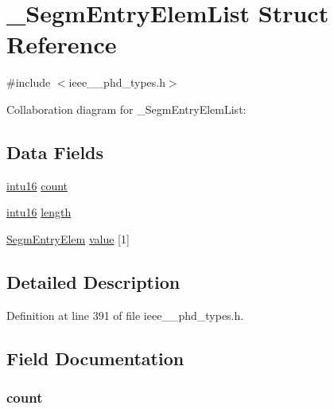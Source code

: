\hypertarget{struct___segm_entry_elem_list}{}\section{\+\_\+\+Segm\+Entry\+Elem\+List Struct Reference}
\label{struct___segm_entry_elem_list}


{\ttfamily \#include $<$ieee\+\_\+\_\+phd\+\_\+types.\+h$>$}



Collaboration diagram for \+\_\+\+Segm\+Entry\+Elem\+List\+:
\subsection*{Data Fields}
\begin{DoxyCompactItemize}
\item 
\hyperlink{ieee__11073__phd__types_8h_a3561595d2aa7416532e1c9910abd076d}{intu16} \hyperlink{struct___segm_entry_elem_list_abf6db060ae8e224764b0f867fb135ecd}{count}
\item 
\hyperlink{ieee__11073__phd__types_8h_a3561595d2aa7416532e1c9910abd076d}{intu16} \hyperlink{struct___segm_entry_elem_list_a3743679e4ff85e3e1b3fc2e59973fbb3}{length}
\item 
\hyperlink{ieee__11073__phd__types_8h_a038faadfbb7a47075cd8d815fafa8c3c}{Segm\+Entry\+Elem} \hyperlink{struct___segm_entry_elem_list_a345d78086f1ff5d9773550cb1f4de9f1}{value} \mbox{[}1\mbox{]}
\end{DoxyCompactItemize}


\subsection{Detailed Description}


Definition at line 391 of file ieee\+\_\+\_\+phd\+\_\+types.\+h.



\subsection{Field Documentation}
\hypertarget{struct___segm_entry_elem_list_abf6db060ae8e224764b0f867fb135ecd}{}
\subsubsection[{count}]{ count}\label{struct___segm_entry_elem_list_abf6db060ae8e224764b0f867fb135ecd}


